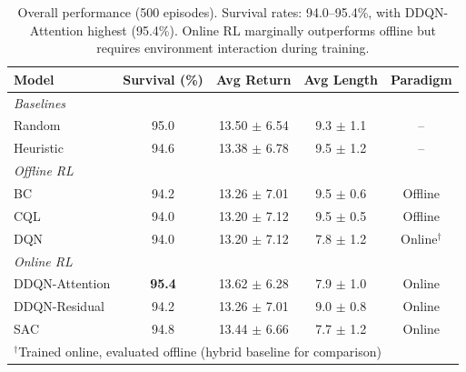 \begin{table}[htbp]
\centering
\caption{Overall performance (500 episodes). Survival rates: 94.0--95.4\%, with DDQN-Attention highest (95.4\%). Online RL marginally outperforms offline but requires environment interaction during training.}
\label{tab:overall-performance}
\begin{tabular}{lcccc}
\toprule
\textbf{Model} & \textbf{Survival (\%)} & \textbf{Avg Return} & \textbf{Avg Length} & \textbf{Paradigm} \\
\midrule
\multicolumn{5}{l}{\textit{Baselines}} \\
Random          & 95.0               & 13.50 $\pm$ 6.54    & 9.3 $\pm$ 1.1       & -- \\
Heuristic       & 94.6               & 13.38 $\pm$ 6.78    & 9.5 $\pm$ 1.2       & -- \\
\midrule
\multicolumn{5}{l}{\textit{Offline RL}} \\
BC              & 94.2               & 13.26 $\pm$ 7.01    & 9.5 $\pm$ 0.6       & Offline \\
CQL             & 94.0               & 13.20 $\pm$ 7.12    & 9.5 $\pm$ 0.5       & Offline \\
DQN             & 94.0               & 13.20 $\pm$ 7.12    & 7.8 $\pm$ 1.2       & Online$^\dagger$ \\
\midrule
\multicolumn{5}{l}{\textit{Online RL}} \\
DDQN-Attention  & \textbf{95.4}      & 13.62 $\pm$ 6.28    & 7.9 $\pm$ 1.0       & Online \\
DDQN-Residual   & 94.2               & 13.26 $\pm$ 7.01    & 9.0 $\pm$ 0.8       & Online \\
SAC             & 94.8               & 13.44 $\pm$ 6.66    & 7.7 $\pm$ 1.2       & Online \\
\bottomrule
\multicolumn{5}{l}{\scriptsize $^\dagger$Trained online, evaluated offline (hybrid baseline for comparison)} \\
\end{tabular}
\end{table}

